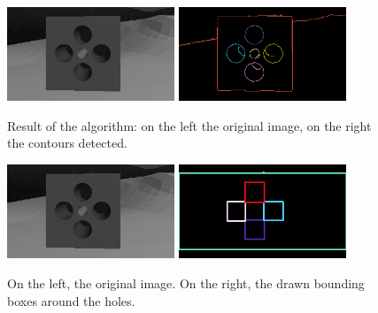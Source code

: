 \begin{figure}[H]
	\centering
	\includegraphics[width=5.0cm]{BoundBox_sourceOnlyPolig}
	\qquad
	\includegraphics[width=5.0cm]{BoundBox_resultOnlyPolig}
	\caption[Result of bounding box detection]{Result of the algorithm: on the left the original image, on the right the contours detected.}
	\label{fig:BoundBoxresultOnlyPolig}
\end{figure}

\begin{figure}[H]
	\centering
	\includegraphics[width=5.0cm]{BoundBox_SourceOnlyRect}
	\qquad
	\includegraphics[width=5.0cm]{BoundBox_resultOnlyRect}
	\caption[Another result of bounding box detection]{On the left, the original image. On the right, the drawn bounding boxes around the holes.}
	\label{fig:BoundBoxresultOnlyRect}
\end{figure}

